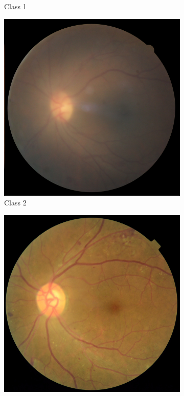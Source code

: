 \documentclass[sigconf,nonacm]{acmart}
\begin{document}
\begin{figure}[H]
\begin{subfigure}{0.18\linewidth}
\caption{Class 1}
\end{subfigure}
\begin{subfigure}{0.18\linewidth}
\centering
\includegraphics[width=0.9\linewidth]{real-class2.png}
\caption{Class 2}
\end{subfigure}
\begin{subfigure}{0.18\linewidth}
\centering
\includegraphics[width=0.9\linewidth]{real-class3.png}

\end{subfigure}
\end{figure}
\end{document}
